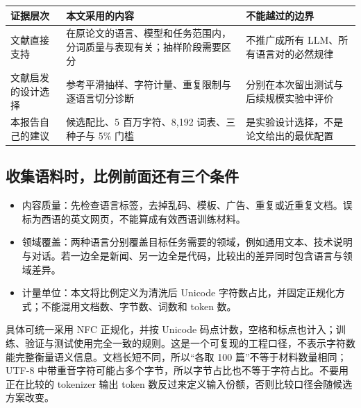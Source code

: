\documentclass[11pt,a4paper]{article}
\newlength{\BpeDocTableWidth}
\newcommand{\BpeDocCodeInline}[1]{{\ttfamily #1}}
\newcommand{\BpeDocSubsection}[2]{\subsection{\texorpdfstring{#1}{#2}}}
\begin{document}
\begingroup\fontsize{9.3}{12.7}\selectfont{}
\setlength{\BpeDocTableWidth}{\dimexpr\linewidth-6\tabcolsep\relax}
\renewcommand{\arraystretch}{1.15}
\par\addvspace{0.45em}
\noindent\begin{minipage}{\linewidth}
\begin{tabular}{>{\raggedright\arraybackslash}p{0.230000\BpeDocTableWidth}>{\raggedright\arraybackslash}p{0.385000\BpeDocTableWidth}>{\raggedright\arraybackslash}p{0.385000\BpeDocTableWidth}}
\toprule
\textbf{证据层次} & \textbf{本文采用的内容} & \textbf{不能越过的边界} \\

\midrule
文献直接支持 & 在原论文的语言、模型和任务范围内，分词质量与表现有关；抽样阶段需要区分 & 不推广成所有 LLM、所有语言对的必然规律 \\[3pt]
文献启发的设计选择 & 参考平滑抽样、字符计量、重复限制与逐语言切分诊断 & 分别在本次留出测试与后续规模实验中评价 \\[3pt]
本报告自己的建议 & 候选配比、5 百万字符、8,192 词表、三种子与 5\% 门槛 & 是实验设计选择，不是论文给出的最优配置 \\[3pt]
\bottomrule
\end{tabular}
\end{minipage}\par\addvspace{0.65em}
\endgroup


\BpeDocSubsection{收集语料时，比例前面还有三个条件}{收集语料时，比例前面还有三个条件}


\begin{itemize}

\item 内容质量：先检查语言标签，去掉乱码、模板、广告、重复或近重复文档。误标为西语的英文网页，不能算成有效西语训练材料。

\item 领域覆盖：两种语言分别覆盖目标任务需要的领域，例如通用文本、技术说明与对话。若一边全是新闻、另一边全是代码，比较出的差异同时包含语言与领域差异。

\item 计量单位：本文将比例定义为清洗后 Unicode 字符数占比，并固定正规化方式；不能混用文档数、字节数、词数和 \BpeDocCodeInline{token} 数。

\end{itemize}



具体可统一采用 NFC 正规化，并按 Unicode 码点计数，空格和标点也计入；训练、验证与测试使用完全一致的规则。这是一个可复现的工程口径，不表示字符数能完整衡量语义信息。文档长短不同，所以“各取 100 篇”不等于材料数量相同；UTF-8 中带重音字符可能占多个字节，所以字节占比也不等于字符占比。不要用正在比较的 tokenizer 输出 \BpeDocCodeInline{token} 数反过来定义输入份额，否则比较口径会随候选方案改变。
\end{document}
